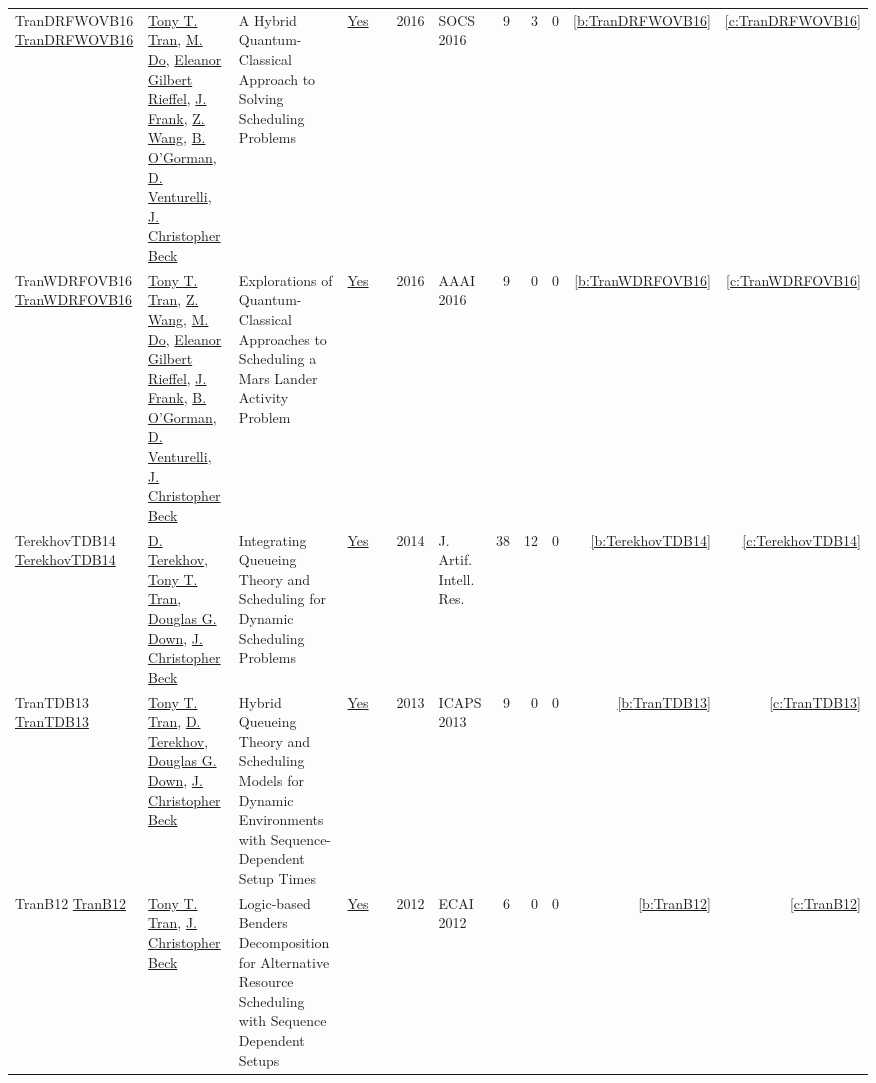 {\begin{longtable}{>{\raggedright\arraybackslash}p{3cm}>{\raggedright\arraybackslash}p{6cm}>{\raggedright\arraybackslash}p{6.5cm}rrrp{2.5cm}rrrrr}
TranDRFWOVB16 \href{https://doi.org/10.1609/socs.v7i1.18390}{TranDRFWOVB16} & \hyperref[auth:a811]{Tony T. Tran}, \hyperref[auth:a821]{M. Do}, \hyperref[auth:a822]{Eleanor Gilbert Rieffel}, \hyperref[auth:a385]{J. Frank}, \hyperref[auth:a820]{Z. Wang}, \hyperref[auth:a823]{B. O'Gorman}, \hyperref[auth:a824]{D. Venturelli}, \hyperref[auth:a89]{J. Christopher Beck} & A Hybrid Quantum-Classical Approach to Solving Scheduling Problems & \href{works/TranDRFWOVB16.pdf}{Yes} & \cite{TranDRFWOVB16} & 2016 & SOCS 2016 & 9 & 3 & 0 & \ref{b:TranDRFWOVB16} & \ref{c:TranDRFWOVB16}\\
TranWDRFOVB16 \href{http://www.aaai.org/ocs/index.php/WS/AAAIW16/paper/view/12664}{TranWDRFOVB16} & \hyperref[auth:a811]{Tony T. Tran}, \hyperref[auth:a820]{Z. Wang}, \hyperref[auth:a821]{M. Do}, \hyperref[auth:a822]{Eleanor Gilbert Rieffel}, \hyperref[auth:a385]{J. Frank}, \hyperref[auth:a823]{B. O'Gorman}, \hyperref[auth:a824]{D. Venturelli}, \hyperref[auth:a89]{J. Christopher Beck} & Explorations of Quantum-Classical Approaches to Scheduling a Mars Lander Activity Problem & \href{works/TranWDRFOVB16.pdf}{Yes} & \cite{TranWDRFOVB16} & 2016 & AAAI 2016 & 9 & 0 & 0 & \ref{b:TranWDRFOVB16} & \ref{c:TranWDRFOVB16}\\
TerekhovTDB14 \href{https://doi.org/10.1613/jair.4278}{TerekhovTDB14} & \hyperref[auth:a830]{D. Terekhov}, \hyperref[auth:a811]{Tony T. Tran}, \hyperref[auth:a815]{Douglas G. Down}, \hyperref[auth:a89]{J. Christopher Beck} & Integrating Queueing Theory and Scheduling for Dynamic Scheduling Problems & \href{works/TerekhovTDB14.pdf}{Yes} & \cite{TerekhovTDB14} & 2014 & J. Artif. Intell. Res. & 38 & 12 & 0 & \ref{b:TerekhovTDB14} & \ref{c:TerekhovTDB14}\\
TranTDB13 \href{http://www.aaai.org/ocs/index.php/ICAPS/ICAPS13/paper/view/6005}{TranTDB13} & \hyperref[auth:a811]{Tony T. Tran}, \hyperref[auth:a830]{D. Terekhov}, \hyperref[auth:a815]{Douglas G. Down}, \hyperref[auth:a89]{J. Christopher Beck} & Hybrid Queueing Theory and Scheduling Models for Dynamic Environments with Sequence-Dependent Setup Times & \href{works/TranTDB13.pdf}{Yes} & \cite{TranTDB13} & 2013 & ICAPS 2013 & 9 & 0 & 0 & \ref{b:TranTDB13} & \ref{c:TranTDB13}\\
TranB12 \href{https://doi.org/10.3233/978-1-61499-098-7-774}{TranB12} & \hyperref[auth:a811]{Tony T. Tran}, \hyperref[auth:a89]{J. Christopher Beck} & Logic-based Benders Decomposition for Alternative Resource Scheduling with Sequence Dependent Setups & \href{works/TranB12.pdf}{Yes} & \cite{TranB12} & 2012 & ECAI 2012 & 6 & 0 & 0 & \ref{b:TranB12} & \ref{c:TranB12}\\
\end{longtable}
}


